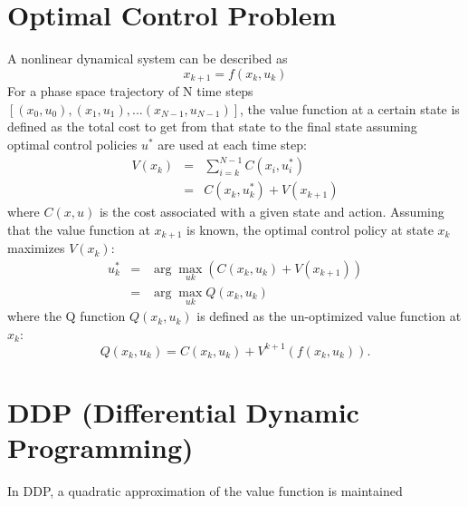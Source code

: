 \documentclass[10 pt]{article}
\begin{document}
\section*{Optimal Control Problem}
A nonlinear dynamical system can be described as
\begin{equation}
x_{k+1}=f(x_k,u_k)
\end{equation}
For a phase space trajectory of N time steps $[(x_0, u_0), (x_1, u_1), ... (x_{N-1},u_{N-1})]$, the value function at a certain state is defined as the total cost to get from that state to the final state assuming optimal control policies $u^*$ are used at each time step:
\begin{eqnarray*}
V(x_k)&=&\sum_{i=k}^{N-1} C(x_i,u_i^*)\\
      &=&C(x_k,u_k^*)+V(x_{k+1})
\end{eqnarray*}
where $C(x,u)$ is the cost associated with a given state and action. Assuming that the value function at $x_{k+1}$ is known, the optimal control policy at state $x_k$ maximizes $V(x_k)$:
\begin{eqnarray}
u_k^* &=& \arg\max_{uk} \left(C(x_k,u_k)+V(x_{k+1})\right)\\
\label{eq:solve_me}
     &=& \arg\max_{uk} Q(x_k,u_k)
\end{eqnarray}
where the Q function $Q(x_k,u_k)$ is defined as the un-optimized value function at $x_k$:
\begin{equation}
\label{eq:Q_function}
Q(x_k,u_k)= C(x_k,u_k)+V^{k+1}(f(x_k,u_k)).
\end{equation}



\section*{DDP (Differential Dynamic Programming)}
In DDP, a quadratic approximation of the value function is maintained
\end{document}
